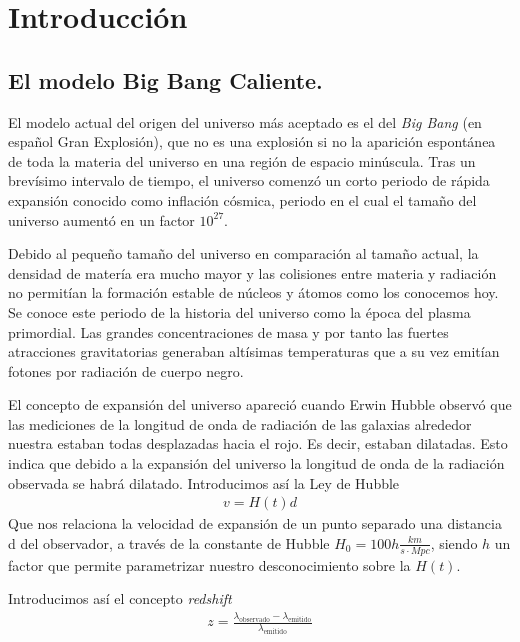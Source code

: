 \chapter{Introducción}

\section{El modelo Big Bang Caliente. }

El modelo actual del origen del universo más aceptado es el del \textit{Big Bang} (en español Gran Explosión), que no es una explosión si no la aparición espontánea de toda la materia del universo en una región de espacio minúscula. Tras un brevísimo intervalo de tiempo, el universo comenzó un corto periodo de rápida expansión conocido como inflación cósmica, periodo en el cual el tamaño del universo aumentó en un factor $10^{27}$.

Debido al pequeño tamaño del universo en comparación al tamaño actual, la densidad de matería era mucho mayor y las colisiones entre materia y radiación no permitían la formación estable de núcleos y átomos como los conocemos hoy. Se conoce este periodo de la historia del universo como la época del plasma primordial. Las grandes concentraciones de masa y por tanto las fuertes atracciones gravitatorias generaban altísimas temperaturas que a su vez emitían fotones por radiación de cuerpo negro. 

El concepto de expansión del universo apareció cuando Erwin Hubble observó que las mediciones de la longitud de onda de radiación de las galaxias alrededor nuestra estaban todas desplazadas hacia el rojo. Es decir, estaban dilatadas. Esto indica que debido a la expansión del universo la longitud de onda de la radiación observada se habrá dilatado. Introducimos así la Ley de Hubble 
\begin{align}
	v = H(t) d
	\label{eq:ley-hubble}
\end{align}
Que nos relaciona la velocidad de expansión de un punto separado una distancia d del observador, a través de la constante de Hubble $H_0 = 100h \frac{km}{s \cdot Mpc}$, siendo $h$ un factor que permite parametrizar nuestro desconocimiento sobre la $H(t)$. 

Introducimos así el concepto \textit{redshift} 
\begin{align}
	z = \frac{\lambda_{\text{observado}} - \lambda_{\text{emitido}}}{\lambda_{\text{emitido}}}
	\label{eq:redshift}
\end{align}


